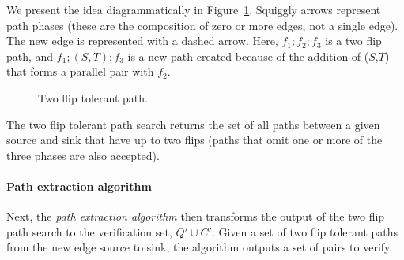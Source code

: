 \documentclass[sigplan,review,nonacm=true]{acmart}
\begin{document}
We present the idea diagrammatically in Figure~\ref{figure_two_flip}.
Squiggly arrows represent path phases (these are the composition of zero or more edges, not a single edge).
The new edge is represented with a dashed arrow.
Here, $f_1 ; f_2 ; f_3$ is a two flip path, and $f_1 ; (S, T) ; f_3$ is a new path created because of the addition of ($S$,$T$) that forms a parallel pair with $f_2$.

\begin{figure}
\begin{center}
\end{center}
\caption{Two flip tolerant path.}
\label{figure_two_flip}
\end{figure}

The two flip tolerant path search returns the set of all paths between a given source and sink that have up to two flips (paths that omit one or more of the three phases are also accepted).

\paragraph{Path extraction algorithm}
Next, the \textit{path extraction algorithm} then transforms the output of the two flip path search to the verification set, $Q' \cup C'$.
Given a set of two flip tolerant paths from the new edge source to sink, the algorithm outputs a set of pairs to verify.
\end{document}
